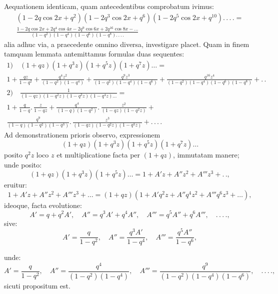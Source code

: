 \documentclass{article}
\begin{document}
Aequationem identicam, quam antecedentibus comprobatum ivimus:
\[
\begin{gathered}
(1-2q\cos 2x+q^{2})(1-2q^{3}\cos 2x+q^{6})(1-2q^{5}\cos 2x+q^{10}).\,.\,.\,.=\\[1.5ex]
\frac{1-2q\cos 2x+2q^{4}\cos 4x-2q^{9}\cos 6x+2q^{16}\cos 8x-\ldots}{(1-q^{2})(1-q^{4})(1-q^{6})(1-q^{8}).\,.\,.\,.}
\end{gathered}
\]
alia adhuc via, a praecedente omnino diversa, investigare placet. Quam in finem tamquam lemmata antemittamus formulas duas sequentes:
\[
\begin{gathered}
\text{1)}\quad(1+qz)(1+q^{3}z)(1+q^{5}z)(1+q^{7}z)\ldots=\\[1.5ex]
1+\frac{qz}{1-q^{2}}+\frac{q^{4}z^{2}}{(1-q^{2})(1-q^{4})}+\frac{q^{9}z^{3}}{(1-q^{2})(1-q^{4})(1-q^{6})}+\frac{q^{16}z^{4}}{(1-q^{2})(1-q^{4})(1-q^{6})(1-q^{8})}+.\,.\\[2ex]
\text{2)}\quad\frac{1}{(1-qz)(1-q^{2}z)(1-q^{3}z)(1-q^{4}z)\ldots}=\\[1.5ex]
1+\frac{q}{1-q}.\,\frac{z}{1-qz}+\frac{q^{4}}{(1-q)(1-q^{2})}.\,\frac{z^{2}}{(1-qz)(1-q^{2}z)}+\\[1.5ex]
\frac{q^{9}}{(1-q)(1-q^{2})(1-q^{3})}.\,\frac{z^{3}}{(1-qz)(1-q^{2}z)(1-q^{3}z)}+.\,.\,.\,.
\end{gathered}
\]
Ad demonstrationem prioris observo, expressionem
\[
(1+qz)(1+q^{3}z)(1+q^{5}z)(1+q^{7}z)\ldots
\]
posito $q^{2}z$ loco $z$ et multiplicatione facta per $(1+qz)$, immutatam manere; unde posito:
\[
(1+qz)(1+q^{3}z)(1+q^{5}z)\ldots=1+A'z+A''z^{2}+A'''z^{3}+.\,.,
\]
eruitur:
\[
1+A'z+A''z^{2}+A'''z^{3}+\ldots=(1+qz)(1+A'q^{2}z+A''q^{4}z^{2}+A'''q^{6}z^{3}+\ldots),
\]
ideoque, facta evolutione:
\[
A'=q+q^{2}A',\quad A''=q^{3}A'+q^{4}A'',\quad A'''=q^{5}A''+q^{6}A''',\quad.\,.\,.\,.,
\]
sive:
\[
A'=\frac{q}{1-q^{2}},\quad A''=\frac{q^{3}A'}{1-q^{4}},\quad A'''=\frac{q^{5}A''}{1-q^{6}},
\]

unde:
\[
A'=\frac{q}{1-q^{2}},\quad A''=\frac{q^{4}}{(1-q^{2})(1-q^{4})},\quad A'''=\frac{q^{9}}{(1-q^{2})(1-q^{4})(1-q^{6})},\quad.\,.\,.\,.,
\]
sicuti propositum est.
\end{document}
